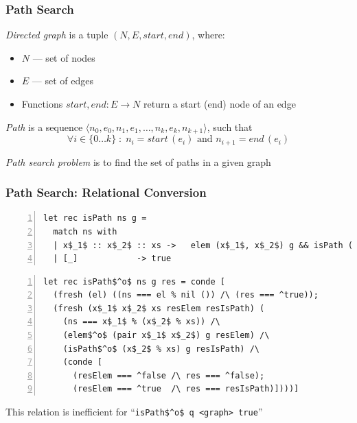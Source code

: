 \documentclass[xcolor=table]{beamer}
\begin{document}
\begin{frame}[fragile]
  \transwipe[direction=90]
  \frametitle{Path Search}

\emph{Directed graph} is a tuple $(N, E, start, end)$, where: 

\begin{itemize}
	\item $N$ --- set of nodes
	\item $E$ --- set of edges
	\item Functions $start, end: E \rightarrow N$ return a start (end) node of an edge
\end{itemize} 

\vspace{10pt}

\emph{Path} is a sequence $\langle n_0, e_0, n_1, e_1, \dots, n_k, e_k, n_{k+1} \rangle$, such that 
\[
\forall i \in \{ 0 \dots k \}\; :\; n_i = start\,(e_i) \text{ and } n_{i+1} = end\,(e_i)
\]

\vspace{10pt}

\emph{Path search problem} is to find the set of paths in a given graph

\end{frame}

\begin{frame}[fragile]
  \transwipe[direction=90]
  \frametitle{Path Search: Relational Conversion }

\begin{lstlisting}[numbers=left,numberstyle=\small]
let rec isPath ns g =
  match ns with
  | x$_1$ :: x$_2$ :: xs ->   elem (x$_1$, x$_2$) g && isPath (x$_2$ :: xs) g 
  | [_]            -> true
\end{lstlisting}

\pause

\begin{lstlisting}[numbers=left,numberstyle=\small]
let rec isPath$^o$ ns g res = conde [
  (fresh (el) ((ns === el % nil ()) /\ (res === ^true));
  (fresh (x$_1$ x$_2$ xs resElem resIsPath) (
    (ns === x$_1$ % (x$_2$ % xs)) /\ 
    (elem$^o$ (pair x$_1$ x$_2$) g resElem) /\
    (isPath$^o$ (x$_2$ % xs) g resIsPath) /\ 
    (conde [
      (resElem === ^false /\ res === ^false); 
      (resElem === ^true  /\ res === resIsPath)])))]
\end{lstlisting}

This relation is inefficient for ``\lstinline{isPath$^o$ q <graph> true}''

\end{frame}
\end{document}
